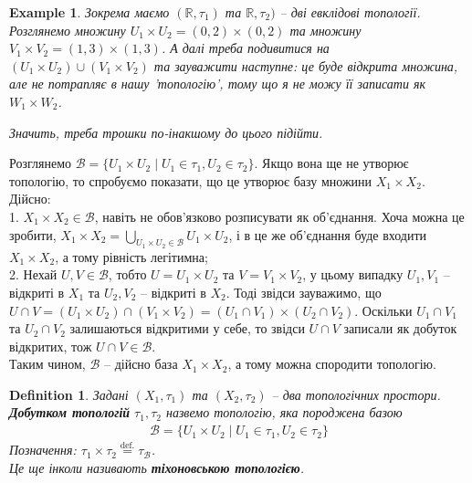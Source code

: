 \documentclass[a4paper, 10pt]{article}
\theoremstyle{theoremdd}
\newtheorem{definition}[theorem]{Definition}
\newtheorem{example}[theorem]{Example}
\begin{document}
\begin{example}
Зокрема маємо $(\mathbb{R},\tau_1)$ та $\mathbb{R},\tau_2)$ -- дві евклідові топології. Розглянемо множину $U_1 \times U_2 = (0,2) \times (0,2)$ та множину $V_1 \times V_2 = (1,3) \times (1,3)$. А далі треба подивитися на $(U_1 \times U_2) \cup (V_1 \times V_2)$ та зауважити наступне: це буде відкрита множина, але не потрапляє в нашу 'топологію', тому що я не можу її записати як $W_1 \times W_2$.
\begin{figure}[H]
\centering
{}
\qquad
{}
\end{figure}
\noindent
Значить, треба трошки по-інакшому до цього підійти.
\end{example}
\noindent
Розглянемо $\mathcal{B} = \{U_1 \times U_2 \mid U_1 \in \tau_1, U_2 \in \tau_2\}$. Якщо вона ще не утворює топологію, то спробуємо показати, що це утворює базу множини $X_1 \times X_2$. Дійсно:\\
1. $X_1 \times X_2 \in \mathcal{B}$, навіть не обов'язково розписувати як об'єднання. Хоча можна це зробити, $X_1 \times X_2 = \displaystyle\bigcup_{U_1 \times U_2 \in \mathcal{B}} U_1 \times U_2$, і в це же об'єднання буде входити $X_1 \times X_2$, а тому рівність легітимна;\\
2. Нехай $U,V \in \mathcal{B}$, тобто $U = U_1 \times U_2$ та $V = V_1 \times V_2$, у цьому випадку $U_1,V_1$ -- відкриті в $X_1$ та $U_2,V_2$ -- відкриті в $X_2$. Тоді звідси зауважимо, що $U \cap V = (U_1 \times U_2) \cap (V_1 \times V_2) = (U_1 \cap V_1) \times (U_2 \cap V_2)$. Оскільки $U_1 \cap V_1$ та $U_2 \cap V_2$ залишаються відкритими у себе, то звідси $U \cap V$ записали як добуток відкритих, тож $U \cap V \in \mathcal{B}$.\\
Таким чином, $\mathcal{B}$ -- дійсно база $X_1 \times X_2$, а тому можна спородити топологію.

\begin{definition}
Задані $(X_1,\tau_1)$ та $(X_2,\tau_2)$ -- два топологічних простори.\\
\textbf{Добутком топологій} $\tau_1,\tau_2$ назвемо топологію, яка породжена базою
\begin{align*}
\mathcal{B} = \{U_1 \times U_2 \mid U_1 \in \tau_1, U_2 \in \tau_2\}
\end{align*}
Позначення: $\tau_1 \times \tau_2 \overset{\text{def.}}{=} \tau_{\mathcal{B}}$.\\
Це ще інколи називають \textbf{тіхоновською топологією}.
\end{definition}
\end{document}
